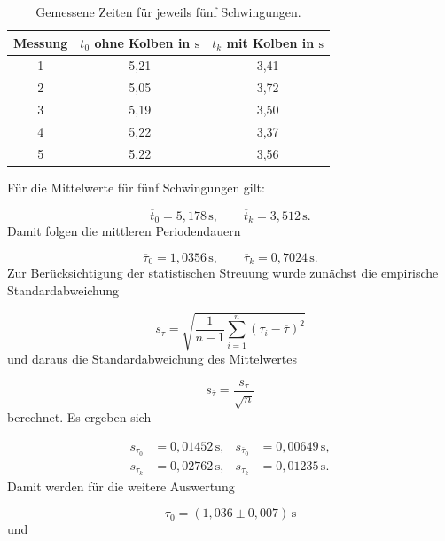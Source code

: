 \documentclass{report}
\begin{document}
\begin{table}[htbp]
    \centering
    \caption{Gemessene Zeiten für jeweils fünf Schwingungen.}
    \begin{tabular}{c|c|c}
        \hline
        Messung & $t_0$ ohne Kolben in $\mathrm{s}$
                & $t_k$ mit Kolben in $\mathrm{s}$\\
        \hline
        1 & 5{,}21 & 3{,}41\\
        2 & 5{,}05 & 3{,}72\\
        3 & 5{,}19 & 3{,}50\\
        4 & 5{,}22 & 3{,}37\\
        5 & 5{,}22 & 3{,}56\\
        \hline
    \end{tabular}
\end{table}
\noindent
Für die Mittelwerte für fünf Schwingungen gilt:

\begin{equation}
\overline{t}_0=5{,}178\,\mathrm{s},
\qquad
\overline{t}_k=3{,}512\,\mathrm{s}.
\end{equation}
\noindent
Damit folgen die mittleren Periodendauern

\begin{equation}
\overline{\tau}_0=1{,}0356\,\mathrm{s},
\qquad
\overline{\tau}_k=0{,}7024\,\mathrm{s}.
\end{equation}
\noindent
Zur Berücksichtigung der statistischen Streuung wurde zunächst die empirische
Standardabweichung

\begin{equation}
s_\tau=
\sqrt{\frac{1}{n-1}
\sum_{i=1}^{n}(\tau_i-\overline{\tau})^2}
\end{equation}
\noindent
und daraus die Standardabweichung des Mittelwertes

\begin{equation}
s_{\overline{\tau}}=\frac{s_\tau}{\sqrt{n}}
\end{equation}
\noindent
berechnet. Es ergeben sich

\begin{align}
s_{\tau_0}&=0{,}01452\,\mathrm{s},
&
s_{\overline{\tau}_0}&=0{,}00649\,\mathrm{s},\\
s_{\tau_k}&=0{,}02762\,\mathrm{s},
&
s_{\overline{\tau}_k}&=0{,}01235\,\mathrm{s}.
\end{align}
\noindent
Damit werden für die weitere Auswertung

\begin{equation}
\boxed{\tau_0=(1{,}036\pm0{,}007)\,\mathrm{s}}
\end{equation}
\noindent
und
\end{document}
